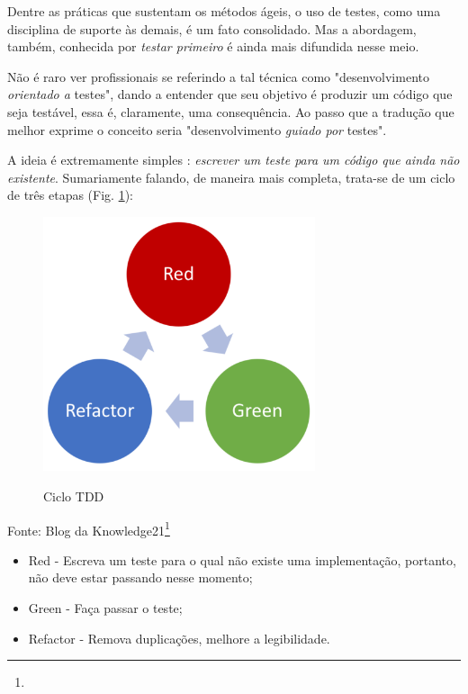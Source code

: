 \documentclass[12pt,a4paper,oneside,english,brazil]{article}
\begin{document}
      Dentre as práticas que sustentam os métodos ágeis, o uso de testes, como
      uma disciplina de suporte às demais, é um fato consolidado. Mas a
      abordagem, também, conhecida por \emph{testar primeiro} é ainda mais
      difundida nesse  meio.

      Não é raro ver profissionais se referindo a tal técnica como
      "desenvolvimento \emph{orientado a} testes", dando a entender que seu
      objetivo é produzir um código que seja testável, essa é, claramente, uma
      consequência. Ao passo que a tradução que melhor exprime o conceito seria
      "desenvolvimento \emph{guiado por} testes".

      A ideia é extremamente simples \cite[p.1]{FreemanPryce2009}: \emph{escrever um
      teste para um código que ainda não existente}. Sumariamente falando, de
      maneira mais completa, trata-se de um ciclo de três etapas
      (Fig. \ref{fig:ciclotdd}):

      \begin{center}
        \begin{figure}[h]
          \centering
          \caption{Ciclo TDD}
          \includegraphics[width=8cm]{ciclo-tdd}
          \label{fig:ciclotdd}
        \end{figure}
        Fonte: Blog da Knowledge21\footnote{}
      \end{center}

      \begin{itemize}
        \item Red - Escreva um teste para o qual não existe uma
          implementação, portanto, não deve estar passando nesse
          momento;
        \item Green - Faça passar o teste;
        \item Refactor - Remova duplicações,  melhore a legibilidade.
      \end{itemize}
\end{document}
